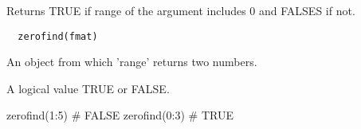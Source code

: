 \begin{Description}\relax
Returns TRUE if range of the argument includes 0 and FALSES if not.
\end{Description}
\begin{Usage}
\begin{verbatim}
  zerofind(fmat)
\end{verbatim}
\end{Usage}
\begin{Arguments}
\begin{ldescription}
\item[\code{fmat}] An object from which 'range' returns two numbers.  

\end{ldescription}
\end{Arguments}
\begin{Value}
A logical value TRUE or FALSE.
\end{Value}
\begin{SeeAlso}\relax
{}
\end{SeeAlso}
\begin{Examples}
\begin{ExampleCode}
zerofind(1:5)
# FALSE
zerofind(0:3)
# TRUE 
\end{ExampleCode}
\end{Examples}

